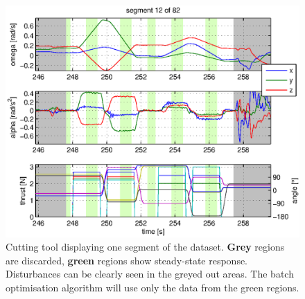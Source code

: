 \begin{figure}[htbp]
\centering
\includegraphics[width = \textwidth]{images/interactive_cut/interactive_cut_detail_modified.eps}
\caption{Cutting tool displaying one segment of the dataset. 
\textbf{Grey} regions are discarded, \textbf{green} regions show steady-state response.
Disturbances can be clearly seen in the greyed out areas.
The batch optimisation algorithm will use only the data from the green regions.}
\end{figure}

